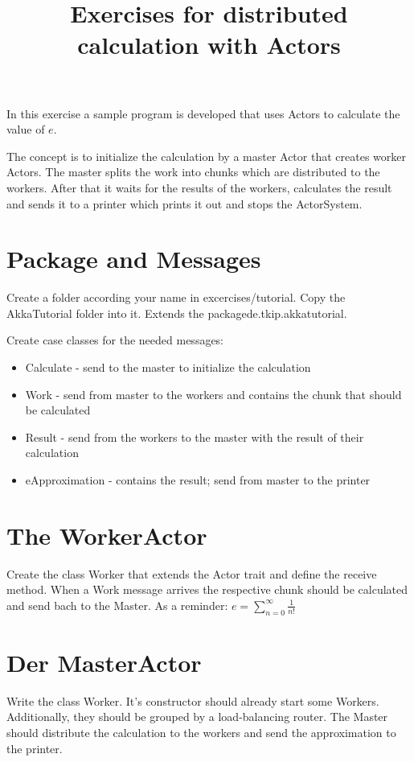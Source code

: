 \documentclass[11pt]{tudexercise}
\title{Exercises for distributed calculation with Actors}
\begin{document}
  \maketitle
  
  In this exercise a sample program is developed that uses Actors to calculate the value of $e$.

The concept is to initialize the calculation by a master Actor that creates worker Actors. The master splits the work into chunks which are distributed to the workers. After that it waits for the results of the workers, calculates the result and sends it to a printer which prints it out and stops the ActorSystem.


\section{Package and Messages}

Create a folder according your name in excercises/tutorial. Copy the AkkaTutorial folder into it. Extends the packagede.tkip.akkatutorial.

Create case classes for the needed messages:
\begin{itemize}
\item Calculate - send to the master to initialize the calculation
\item Work - send from master to the workers and contains the chunk that should be calculated
\item Result - send from the workers to the master with the result of their calculation
\item eApproximation - contains the result; send from master to the printer
\end{itemize}

\section{The WorkerActor}

Create the class Worker that extends the Actor trait and define the receive method. When a Work message arrives the respective chunk should be calculated and send bach to the Master. As a reminder: $e = \sum_{n=0}^{\infty}{\frac{1}{n!}}$

\section{Der MasterActor}

Write the class Worker. It's constructor should already start some Workers. Additionally, they should be grouped by a load-balancing router. The Master should distribute the calculation to the workers and send the approximation to the printer.
\end{document}
